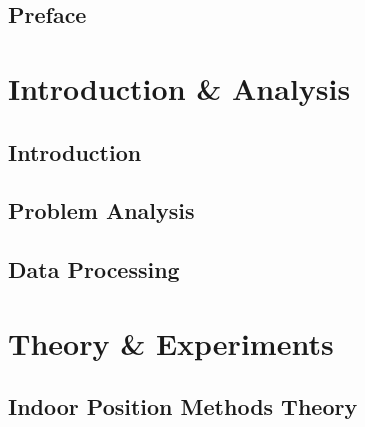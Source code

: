 \cleardoublepage
{}
\pagestyle{fancy} %

\setcounter{tocdepth}{1}
\tableofcontents

\chapter*{Preface}


\renewcommand{\glsgroupskip}{}
\printglossaries
\newpage{}

\part{Introduction \& Analysis}

\chapter{Introduction}


\chapter{Problem Analysis}




%
%



%
%


\chapter{Data Processing}



\part{Theory \& Experiments}
\chapter{Indoor Position Methods Theory}








